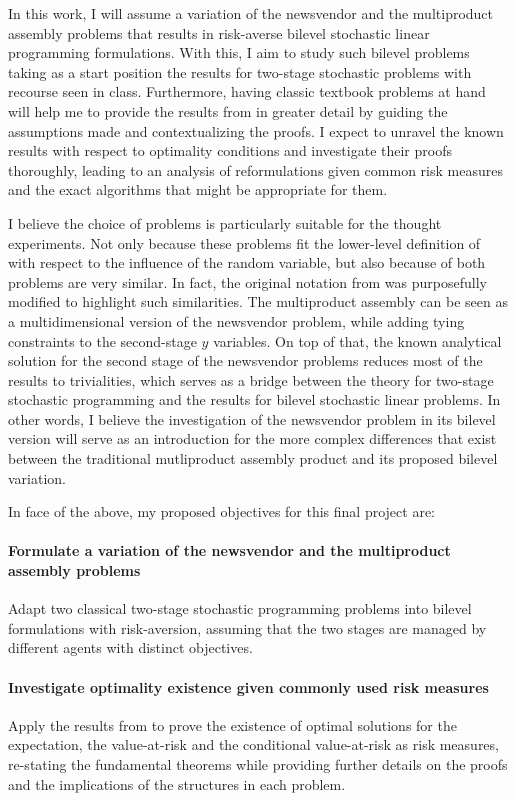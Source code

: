 \documentclass[12pt]{article}
\begin{document}
In this work, I will assume a variation of the newsvendor and the multiproduct assembly problems that results in risk-averse bilevel stochastic linear programming formulations.
With this, I aim to study such bilevel problems taking as a start position the results for two-stage stochastic problems with recourse seen in class. 
Furthermore, having classic textbook problems at hand will help me to provide the results from \citet{burtscheidtRiskAverseModelsBilevel2020} in greater detail by guiding the assumptions made and contextualizing the proofs.
I expect to unravel the known results with respect to optimality conditions and investigate their proofs thoroughly, leading to an analysis of reformulations given common risk measures and the exact algorithms that might be appropriate for them.

I believe the choice of problems is particularly suitable for the thought experiments.
Not only because these problems fit the lower-level definition of \citet{burtscheidtBilevelLinearOptimization2020} with respect to the influence of the random variable, but also because of both problems are very similar.
In fact, the original notation from \citet{shapiroLecturesStochasticProgramming2009} was purposefully modified to highlight such similarities.
The multiproduct assembly can be seen as a multidimensional version of the newsvendor problem, while adding tying constraints to the second-stage $y$ variables.
On top of that, the known analytical solution for the second stage of the newsvendor problems reduces most of the results to trivialities, which serves as a bridge between the theory for two-stage stochastic programming and the results for bilevel stochastic linear problems.
In other words, I believe the investigation of the newsvendor problem in its bilevel version will serve as an introduction for the more complex differences that exist between the traditional mutliproduct assembly product and its proposed bilevel variation.

In face of the above, my proposed objectives for this final project are:
\paragraph{Formulate a variation of the newsvendor and the multiproduct assembly problems}
Adapt two classical two-stage stochastic programming problems into bilevel formulations with risk-aversion, assuming that the two stages are managed by different agents with distinct objectives.
\paragraph{Investigate optimality existence given commonly used risk measures}
Apply the results from \citet{burtscheidtRiskAverseModelsBilevel2020} to prove the existence of optimal solutions for the expectation, the value-at-risk and the conditional value-at-risk as risk measures, re-stating the fundamental theorems while providing further details on the proofs and the implications of the structures in each problem.
\end{document}
